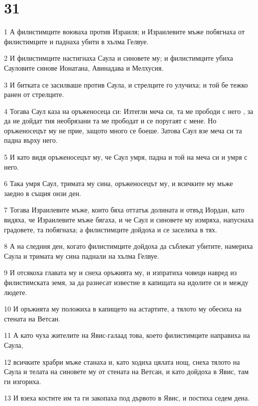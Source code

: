 \chapter{31}

\par 1 А филистимците воюваха против Израиля; и Израилевите мъже побягнаха от филистимците и паднаха убити в хълма Гелвуе.
\par 2 И филистимците настигнаха Саула и синовете му; и филистимците убиха Сауловите синове Ионатана, Авинадава и Мелхусия.
\par 3 И битката се засилваше против Саула, и стрелците го улучиха; и той бе тежко ранен от стрелците.
\par 4 Тогава Саул каза на оръженосеца си: Изтегли меча си, та ме прободи с него , за да не дойдат тия необрязани та ме прободат и се поругаят с мене. Но оръженосецът му не прие, защото много се боеше. Затова Саул взе меча си та падна върху него.
\par 5 И като видя оръженосецът му, че Саул умря, падна и той на меча си и умря с него.
\par 6 Така умря Саул, тримата му сина, оръженосецът му, и всичките му мъже заедно в същия онзи ден.
\par 7 Тогава Израилевите мъже, които бяха оттатък долината и отвъд Иордан, като видяха, че Израилевите мъже бягаха, и че Саул и синовете му измряха, напуснаха градовете, та побягнаха; а филистимците дойдоха и се заселиха в тях.
\par 8 А на следния ден, когато филистимците дойдоха да съблекат убитите, намериха Саула и тримата му сина паднали на хълма Гелвуе.
\par 9 И отсякоха главата му и снеха оръжията му, и изпратиха човеци навред из филистимската земя, за да разнесат известие в капищата на идолите си и между людете.
\par 10 И оръжията му положиха в капището на астартите, а тялото му обесиха на стената на Ветсан.
\par 11 А като чуха жителите на Явис-галаад това, което филистимците направиха на Саула,
\par 12 всичките храбри мъже станаха и, като ходиха цялата нощ, снеха тялото на Саула и телата на синовете му от стената на Ветсан, и като дойдоха в Явис, там ги изгориха.
\par 13 И взеха костите им та ги закопаха под дървото в Явис, и постиха седем дена.


